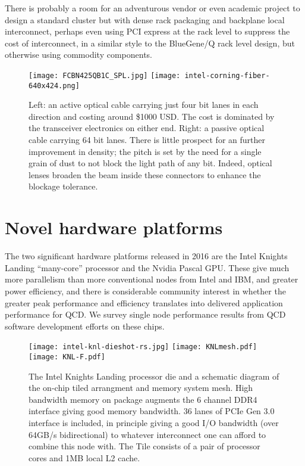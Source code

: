 \documentclass{PoS}
\begin{document}
There is probably a room for an adventurous vendor or even academic project
to design a standard cluster but with dense rack packaging and backplane local interconnect,
perhaps even using PCI express at the rack level to suppress the cost of interconnect, in a similar style to the BlueGene/Q rack level design,
but otherwise using commodity components.

\begin{figure}
\texttt{[image: FCBN425QB1C\_SPL.jpg]} 
\texttt{[image: intel-corning-fiber-640x424.png]} 
\caption{ \label{fig:figAOC} Left: an active optical cable carrying just four bit lanes in each direction and costing around \$1000 USD.
The cost is dominated by the transceiver electronics on either end.
Right: a passive optical cable carrying 64 bit lanes. There is little prospect for an further improvement in density; the pitch is
set by the need for a single grain of dust to not block the light path of any bit. Indeed, optical lenses broaden the beam inside these connectors
to enhance the blockage tolerance. }
\end{figure}

\section{Novel hardware platforms}

The two significant hardware platforms released in 2016 are the Intel Knights Landing ``many-core'' processor
and the  Nvidia Pascal GPU. These give much more parallelism than more conventional nodes from Intel and IBM,
and greater power efficiency, and there is considerable community interest in whether the greater peak
performance and efficiency translates into delivered application performance for QCD. We survey single
node performance results from QCD software development efforts on these chips.


\begin{figure}[hbt]
\texttt{[image: intel-knl-dieshot-rs.jpg]}
\texttt{[image: KNLmesh.pdf]}
\texttt{[image: KNL-F.pdf]}
\caption{\label{fig:knl}
The Intel Knights Landing processor die and a schematic diagram of the on-chip tiled arrangment and memory
system mesh. High bandwidth memory on package augments the 6 channel DDR4 interface giving good memory bandwidth.
36 lanes of PCIe Gen 3.0 interface is included, in principle giving a good I/O bandwidth (over 64GB/s bidirectional) to whatever
interconnect one can afford to combine this node with. The Tile consists of a pair of processor cores and 1MB local L2 cache.
}
\end{figure}
\end{document}
